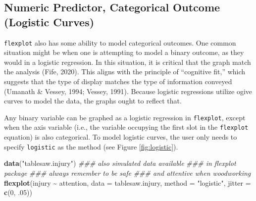 \documentclass[
  man]{apa6}
\newenvironment{Shaded}{\begin{snugshade}}{\end{snugshade}}
\newcommand{\CommentTok}[1]{\textcolor[rgb]{0.56,0.35,0.01}{\textit{#1}}}
\newcommand{\DataTypeTok}[1]{\textcolor[rgb]{0.13,0.29,0.53}{#1}}
\newcommand{\DecValTok}[1]{\textcolor[rgb]{0.00,0.00,0.81}{#1}}
\newcommand{\FloatTok}[1]{\textcolor[rgb]{0.00,0.00,0.81}{#1}}
\newcommand{\KeywordTok}[1]{\textcolor[rgb]{0.13,0.29,0.53}{\textbf{#1}}}
\newcommand{\NormalTok}[1]{#1}
\newcommand{\OperatorTok}[1]{\textcolor[rgb]{0.81,0.36,0.00}{\textbf{#1}}}
\newcommand{\StringTok}[1]{\textcolor[rgb]{0.31,0.60,0.02}{#1}}
\begin{document}
\hypertarget{numeric-predictor-categorical-outcome-logistic-curves}{%
\subsection{Numeric Predictor, Categorical Outcome (Logistic Curves)}\label{numeric-predictor-categorical-outcome-logistic-curves}}

\texttt{flexplot} also has some ability to model categorical outcomes. One common situation might be when one is attempting to model a binary outcome, as they would in a logistic regression. In this situation, it is critical that the graph match the analysis (Fife, 2020). This aligns with the principle of ``cognitive fit,'' which suggests that the type of display matches the type of information conveyed (Umanath \& Vessey, 1994; Vessey, 1991). Because logistic regressions utilize ogive curves to model the data, the graphs ought to reflect that.

Any binary variable can be graphed as a logistic regression in \texttt{flexplot}, except when the axis variable (i.e., the variable occupying the first slot in the \texttt{flexplot} equation) is also categorical. To model logistic curves, the user only needs to specify \texttt{logistic} as the method (see Figure \ref{fig:logistic}).

\small

\begin{Shaded}
\begin{Highlighting}[]
\KeywordTok{data}\NormalTok{(}\StringTok{"tablesaw.injury"}\NormalTok{) }\CommentTok{\#\#\# also simulated data available }
                        \CommentTok{\#\#\# in flexplot package}
                        \CommentTok{\#\#\# always remember to be safe }
                        \CommentTok{\#\#\# and attentive when woodworking}
\KeywordTok{flexplot}\NormalTok{(injury }\OperatorTok{\textasciitilde{}}\StringTok{ }\NormalTok{attention, }\DataTypeTok{data =}\NormalTok{ tablesaw.injury, }
             \DataTypeTok{method =} \StringTok{"logistic"}\NormalTok{, }\DataTypeTok{jitter =} \KeywordTok{c}\NormalTok{(}\DecValTok{0}\NormalTok{, }\FloatTok{.05}\NormalTok{))}
\end{Highlighting}
\end{Shaded}
\end{document}
